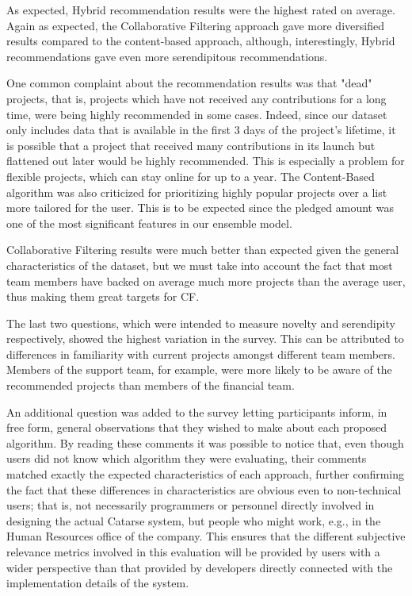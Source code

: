 \documentclass[cic,tc,english]{iiufrgs}
\begin{document}
As expected, Hybrid recommendation results were the highest rated on average. Again as expected, the Collaborative Filtering approach gave more diversified results compared to the content-based approach, although, interestingly, Hybrid recommendations gave even more serendipitous recommendations. 

One common complaint about the recommendation results was that "dead" projects, that is, projects which have not received any contributions for a long time, were being highly recommended in some cases. Indeed, since our dataset only includes data that is available in the first 3 days of the project's lifetime, it is possible that a project that received many contributions in its launch but flattened out later would be highly recommended. This is especially a problem for flexible projects, which can stay online for up to a year. The Content-Based algorithm was also criticized for prioritizing highly popular projects over a list more tailored for the user. This is to be expected since the pledged amount was one of the most significant features in our ensemble model.

Collaborative Filtering results were much better than expected given the general characteristics of the dataset, but we must take into account the fact that most team members have backed on average much more projects than the average user, thus making them great targets for CF. 

The last two questions, which were intended to measure novelty and serendipity respectively, showed the highest variation in the survey. This can be attributed to differences in familiarity with current projects amongst different team members. Members of the support team, for example, were more likely to be aware of the recommended projects than members of the financial team.

An additional question was added to the survey letting participants inform, in free form, general observations that they wished to make about each proposed algorithm. By reading these comments it was possible to notice that, even though users did not know which algorithm they were evaluating, their comments matched exactly the expected characteristics of each approach, further confirming the fact that these differences in characteristics are obvious even to non-technical users; that is, not necessarily programmers or personnel directly involved in designing the actual Catarse system, but people who might work, e.g., in the Human Resources office of the company. This ensures that the different subjective relevance metrics involved in this evaluation will be provided by users with a wider perspective than that provided by developers directly connected with the implementation details of the system.
\end{document}
